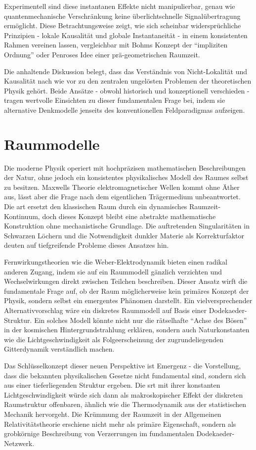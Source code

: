 Experimentell sind diese instantanen Effekte nicht manipulierbar, genau wie quantenmechanische Verschränkung keine überlichtschnelle Signalübertragung ermöglicht. Diese Betrachtungsweise
zeigt, wie sich scheinbar widersprüchliche Prinzipien - lokale Kausalität und globale Instantaneität - in einem konsistenten Rahmen vereinen lassen, vergleichbar mit Bohms Konzept der
\enquote{impliziten Ordnung} oder Penroses Idee einer prä-geometrischen Raumzeit.

Die anhaltende Diskussion belegt, dass das Verständnis von Nicht-Lokalität und Kausalität nach wie vor zu den zentralen ungelösten Problemen der theoretischen Physik gehört.
Beide Ansätze - obwohl historisch und konzeptionell verschieden - tragen wertvolle Einsichten zu dieser fundamentalen Frage bei, indem sie alternative Denkmodelle jenseits des
konventionellen Feldparadigmas aufzeigen.

\section{Raummodelle}
Die moderne Physik operiert mit hochpräzisen mathematischen Beschreibungen der Natur, ohne jedoch ein konsistentes physikalisches Modell des Raumes selbst zu besitzen. Maxwells Theorie
elektromagnetischer Wellen kommt ohne Äther aus, lässt aber die Frage nach dem eigentlichen Trägermedium unbeantwortet. Die \gls{art} ersetzt den klassischen Raum durch ein dynamisches
Raumzeit-Kontinuum, doch dieses Konzept bleibt eine abstrakte mathematische Konstruktion ohne mechanistische Grundlage. Die auftretenden Singularitäten in Schwarzen Löchern und die
Notwendigkeit dunkler Materie als Korrekturfaktor deuten auf tiefgreifende Probleme dieses Ansatzes hin.

Fernwirkungstheorien wie die Weber-Elektrodynamik bieten einen radikal anderen Zugang, indem sie auf ein Raummodell gänzlich verzichten und Wechselwirkungen direkt zwischen Teilchen
beschreiben. Dieser Ansatz wirft die fundamentale Frage auf, ob der Raum möglicherweise kein primäres Konzept der Physik, sondern selbst ein emergentes Phänomen darstellt. Ein
vielversprechender Alternativvorschlag wäre ein diskretes Raummodell auf Basis einer Dodekaeder-Struktur. Ein solches Modell könnte nicht nur die rätselhafte \enquote{Achse des Bösen} in der
kosmischen Hintergrundstrahlung erklären, sondern auch Naturkonstanten wie die Lichtgeschwindigkeit als Folgeerscheinung der zugrundeliegenden Gitterdynamik verständlich machen.

Das Schlüsselkonzept dieser neuen Perspektive ist Emergenz - die Vorstellung, dass die bekannten physikalischen Gesetze nicht fundamental sind, sondern sich aus einer tieferliegenden
Struktur ergeben. Die \gls{srt} mit ihrer konstanten Lichtgeschwindigkeit würde sich dann als makroskopischer Effekt der diskreten Raumstruktur offenbaren, ähnlich
wie die Thermodynamik aus der statistischen Mechanik hervorgeht. Die Krümmung der Raumzeit in der Allgemeinen Relativitätstheorie erschiene nicht mehr als primäre Eigenschaft, sondern
als grobkörnige Beschreibung von Verzerrungen im fundamentalen Dodekaeder-Netzwerk.

